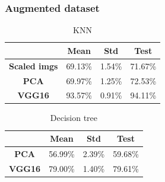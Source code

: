 \documentclass[aspectratio=169]{beamer}
\begin{document}
\begin{frame}
  \frametitle{Augmented dataset}
  \begin{table}
    \centering
    \captionsetup{labelformat=empty}
    \caption{KNN}
    \begin{tabular}{|c|c|c|c|}
    \hline
       & Mean & Std & Test \\
      \hline
      \textbf{Scaled imgs} & 69.13\% & 1.54\% & 71.67\% \\
      \hline
      \textbf{PCA} & 69.97\% & 1.25\% & 72.53\% \\
      \hline
      \textbf{VGG16} & 93.57\% & 0.91\% & 94.11\% \\
      \hline
    \end{tabular}
  \end{table}
  \begin{table}
    \centering
    \captionsetup{labelformat=empty}
    \caption{Decision tree}
    \begin{tabular}{|c|c|c|c|}
    \hline
       & Mean & Std & Test \\
      \hline
      \textbf{PCA} & 56.99\% & 2.39\% & 59.68\% \\
      \hline
      \textbf{VGG16} & 79.00\% & 1.40\% & 79.61\% \\
      \hline
    \end{tabular}
  \end{table}
\end{frame}
\end{document}
